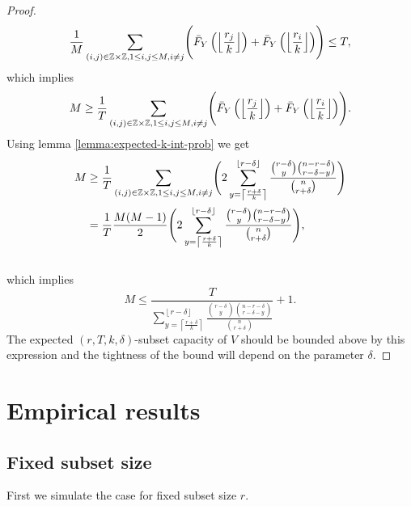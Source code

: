 \begin{proof}
\begin{equation*}
      \frac{1}{M} \sum_{(i,j) \in \mathbb{Z}\times\mathbb{Z}, 1 \le i,j \le M, i \ne j}  \Biggl( \bar{F}_Y\left(\left\lfloor \frac{r_j}{k} \right\rfloor\right) + \bar{F}_Y\left(\left\lfloor \frac{r_i}{k} \right\rfloor\right) \Biggr)  \le T,
\end{equation*}
\noindent which implies
\begin{equation}
\label{equ:cap-r}      
       M \geq \frac{1}{T}\sum_{(i,j) \in \mathbb{Z}\times\mathbb{Z}, 1 \le i,j \le M, i \ne j}  \Biggl( \bar{F}_Y\left(\left\lfloor \frac{r_j}{k} \right\rfloor\right) + \bar{F}_Y\left(\left\lfloor \frac{r_i}{k} \right\rfloor\right)\Biggr). 
\end{equation}
Using lemma \ref{lemma:expected-k-int-prob} we get
\begin{equation}
\label{equ:cap-r-2}
    \begin{split}
           M &\ge
           \frac{1}{T}\sum_{(i,j) \in \mathbb{Z}\times\mathbb{Z}, 1 \le i,j \le M, i \ne j}  \Biggl( 2 \sum_{y = \left\lceil \frac{r+\delta}{k} \right\rceil}^{\left\lfloor r - \delta \right\rfloor} \frac{\binom{r-\delta}{y} \binom{n-r-\delta}{r-\delta-y}}{\binom{n}{r+\delta}}\Biggr) \\
           &=\frac{1}{T} \frac{M(M-1)}{2} \Biggl( 2 \sum_{y = \left\lceil \frac{r+\delta}{k} \right\rceil}^{\left\lfloor r - \delta \right\rfloor} \frac{\binom{r-\delta}{y} \binom{n-r-\delta}{r-\delta-y}}{\binom{n}{r+\delta}}\Biggr),
    \end{split}
    \end{equation} \\
\noindent which implies 
\begin{equation}
    \label{equ:cap-r-bounded}     
    M \le \frac{T}{\sum_{y = \left\lceil \frac{r+\delta}{k} \right\rceil}^{\left\lfloor r - \delta \right\rfloor} \frac{\binom{r-\delta}{y} \binom{n-r-\delta}{r-\delta-y}}{\binom{n}{r+\delta}}} + 1.
\end{equation}
The expected $(r,T,k,\delta)$-subset capacity of $V$ should be bounded above by this expression and the tightness of the bound will depend on the parameter $\delta$. 
\end{proof}

\section{Empirical results}

\subsection{Fixed subset size}
First we simulate the case for fixed subset size $r$. 

